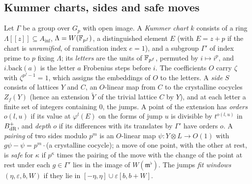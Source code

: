 \subsection{Kummer charts, sides and safe moves}\label{ss:kummer-charts}
Let $\Gamma$ be a group over $G_p$ with open image. A \emph{Kummer chart} $k$ consists of a ring $\Lambda[\![z]\!]\subseteq A_{\inf}$, $\Lambda=W(\mathbb{F}_{p^f})$, a distinguished element $E$ (with $E=z+p$ if the chart is \emph{unramified}, of ramification index
$e=1$), and a subgroup $\Gamma'$ of index prime to $p$ fixing $\Lambda$; its \emph{letters} are the units of $\mathbb{F}_{p^f}$, permuted by $i\mapsto i^p$, and $i.\mathrm{back}(a)$ is the letter $a$ Frobenius steps before $i$. The coefficients
$O$ carry $\zeta$ with $\zeta^{p^f-1}=1$, which assigns the embeddings of $O$ to the letters. A \emph{side} $S$ consists of lattices $Y$ and $C$, an $O$-linear map from $C$ to the crystalline cocycles $Z_f(Y)$ (hence an extension $\tilde Y$ of
the trivial lattice $C$ by $Y$), and at each letter a finite set of integers containing $0$, the jumps. A point of the extension has \emph{orders} $o(l,u)$ if its value at $\varphi^l(E)$ on the forms of jump $u$ is divisible by
$t^{o(l,u)}$ in $B_{\rm dR}^+$, and \emph{depth} $o$ if its differences with its translates by $\Gamma'$ have orders $o$. A \emph{pairing} of two sides modulo $p^m$ is an $O$-linear map $\psi\colon Y\otimes L\to O(1)$ with
$g\psi-\psi=p^m\cdot$(a crystalline cocycle); a move of one point, with the other at rest, is \emph{safe} for $\kappa$ if $p^\kappa$ times the pairing of the move with the change of the point at rest under each $g\in\Gamma'$ lies in the
image of $W(\mathfrak m^\flat)$. The jumps \emph{fit windows} $(\eta,\varepsilon,b,W)$ if they lie in $[-\eta,\eta]\cup\varepsilon[b,b+W]$.

